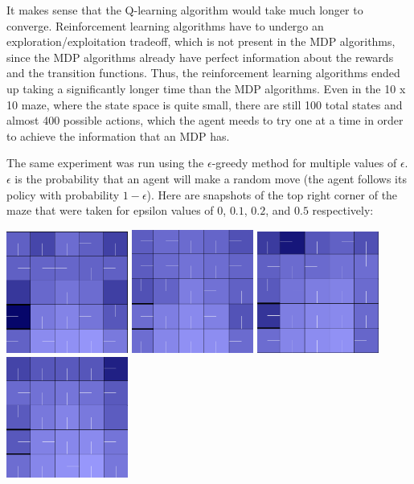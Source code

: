 \documentclass[11pt]{article}
\begin{document}
            It makes sense that the Q-learning algorithm would take much longer to
            converge. Reinforcement learning algorithms have to undergo an exploration/exploitation
            tradeoff, which is not present in the MDP algorithms, since the MDP algorithms
            already have perfect information about the rewards and the transition functions.
            Thus, the reinforcement learning algorithms ended up taking a significantly
            longer time than the MDP algorithms. Even in the 10 x 10 maze, where
            the state space is quite small, there are still 100 total states and almost 400
            possible actions, which the agent meeds to try one at a time in order to achieve
            the information that an MDP has.

            The same experiment was run using the $\epsilon$-greedy method for multiple
            values of $\epsilon$. $\epsilon$ is the probability that an agent will make a random
            move (the agent follows its policy with probability $1 - \epsilon$).
            Here are snapshots of the top right corner of the maze that were taken for epsilon values
            of $0$, $0.1$, $0.2$, and $0.5$ respectively:

            \includegraphics[width=4cm]{../images/small/tr_eps0.PNG}
           \includegraphics[width=4cm]{../images/small/tr_eps01.PNG}
            \includegraphics[width=4cm]{../images/small/tr_eps02.PNG}
            \includegraphics[width=4cm]{../images/small/tr_eps05.PNG}
\end{document}
